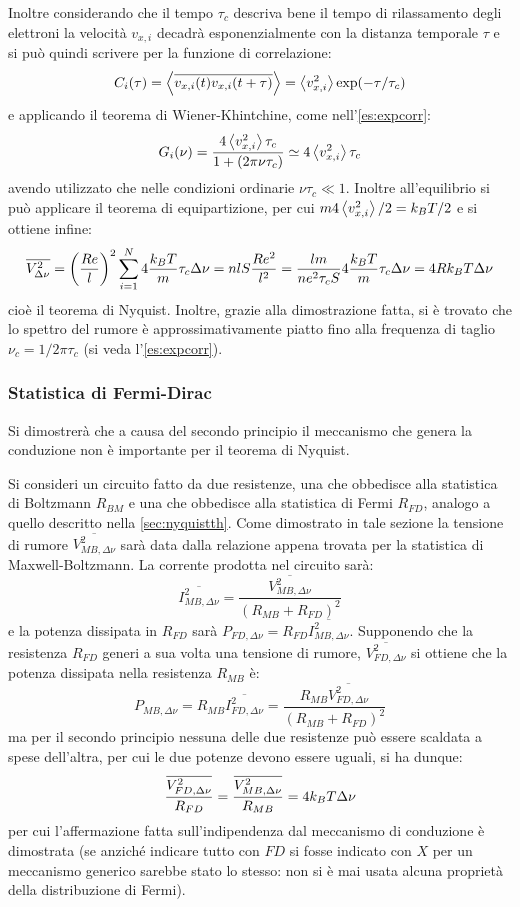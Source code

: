 Inoltre considerando che il tempo $ \tau_c $ descriva bene il tempo di rilassamento degli elettroni la  velocità $ v_{x,i} $ decadrà esponenzialmente con la distanza temporale $ \tau $ e si può quindi scrivere per la funzione di correlazione:
\[ C_i(\tau) = \expval{\overline{v_{x,i}(t) v_{x,i}(t + \tau)}} = \expval{v_{x,i}^2} \exp(-\tau/\tau_c) \]
e applicando il teorema di Wiener-Khintchine, come nell'\cref{es:expcorr}:
\[ G_i(\nu) = \frac{4\expval{v_{x,i}^2}\tau_c}{1 + (2\pi \nu \tau_c)} \simeq 4\expval{v_{x,i}^2}\tau_c \]
avendo utilizzato che nelle condizioni ordinarie $ \nu \tau_c \ll 1 $.
Inoltre all'equilibrio si può applicare il teorema di equipartizione, per cui $ m4\expval{v_{x,i}^2}/2 = k_B T/2 $ e si ottiene infine:
\[ \overline{V_{\Delta \nu}^2} = \left(\frac{R e}{l}\right)^2 \sum_{i=1}^{N} 4\frac{k_B T}{m}\tau_c \Delta \nu = n l S \frac{R e^2}{l^2} = \frac{lm}{ne^2 \tau_c S} 4\frac{k_B T}{m}\tau_c \Delta \nu = 4 R k_B T \Delta \nu \]
cioè il teorema di Nyquist. Inoltre, grazie alla dimostrazione fatta, si è trovato che lo spettro del rumore è approssimativamente piatto fino alla frequenza di taglio $ \nu_c = 1/2\pi\tau_c $ (si veda l'\cref{es:expcorr}).

\subsubsection{Statistica di Fermi-Dirac}

Si dimostrerà che a causa del secondo principio il meccanismo che genera la conduzione non è importante per il teorema di Nyquist.

Si consideri un circuito fatto da due resistenze, una che obbedisce alla statistica di Boltzmann $ R_{BM} $ e una che obbedisce alla statistica di Fermi $ R_{FD} $, analogo a quello descritto nella \cref{sec:nyquistth}.
Come dimostrato in tale sezione la tensione di rumore $\overline{V_{MB,\Delta\nu}^2}$ sarà data dalla relazione appena trovata per la statistica di Maxwell-Boltzmann. La corrente prodotta nel circuito sarà:
\[ \overline{I_{MB,\Delta\nu}^2} = \frac{\overline{V_{MB,\Delta\nu}^2}}{(R_{MB} + R_{FD})^2}\]
e la potenza dissipata in $ R_{FD} $ sarà $ P_{FD,\Delta\nu} = R_{FD} \overline{I_{MB,\Delta\nu}^2}$.
Supponendo che la resistenza $ R_{FD} $ generi a sua volta una tensione di rumore, $ \overline{V_{FD,\Delta\nu}^2} $ si ottiene che la potenza dissipata nella resistenza $ R_{MB} $ è:
\[ P_{MB,\Delta\nu} = R_{MB} \overline{I_{FD,\Delta\nu}^2} = \frac{R_{MB} \overline{V_{FD,\Delta\nu}^2}}{(R_{MB} + R_{FD})^2}\]
ma per il secondo principio nessuna delle due resistenze può essere scaldata a spese dell'altra, per cui le due potenze devono essere uguali, si ha dunque:
\[ \frac{\overline{V_{FD,\Delta\nu}^2} }{R_{FD}} = \frac{\overline{V_{MB,\Delta\nu}^2} }{R_{MB}} =  4 k_B T \Delta\nu\]
per cui l'affermazione fatta sull'indipendenza dal meccanismo di conduzione è dimostrata (se anziché indicare tutto con $ FD $ si fosse indicato con $ X $ per un meccanismo generico sarebbe stato lo stesso: non si è mai usata alcuna proprietà della distribuzione di Fermi).

